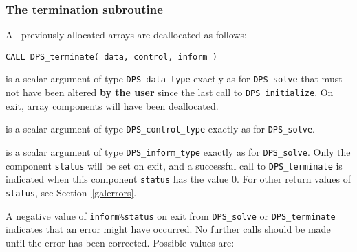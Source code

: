 \documentclass{galahad}
\newcommand{\packagename}{DPS}
\begin{document}

\subsubsection{The  termination subroutine}
All previously allocated arrays are deallocated as follows:

\hskip0.5in
{\tt CALL \packagename\_terminate( data, control, inform )}

\begin{description}

 is a scalar \intentinout argument of type
{\tt \packagename\_data\_type}
exactly as for
{\tt \packagename\_solve}
that must not have been altered {\bf by the user} since the last call to
{\tt \packagename\_initialize}.
On exit, array components will have been deallocated.

 is a scalar \intentin argument of type
{\tt \packagename\_control\_type}
exactly as for
{\tt \packagename\_solve}.

 is a scalar \intentout argument of type
{\tt \packagename\_inform\_type}
exactly as for
{\tt \packagename\_solve}.
Only the component {\tt status} will be set on exit, and a
successful call to
{\tt \packagename\_terminate}
is indicated when this  component {\tt status} has the value 0.
For other return values of {\tt status}, see Section~\ref{galerrors}.

\end{description}


\galerrors
A negative value of  {\tt inform\%status} on exit from
{\tt \packagename\_solve}
or
{\tt \packagename\_terminate}
indicates that an error might have occurred. No further calls should be made
until the error has been corrected. Possible values are:
\end{document}
